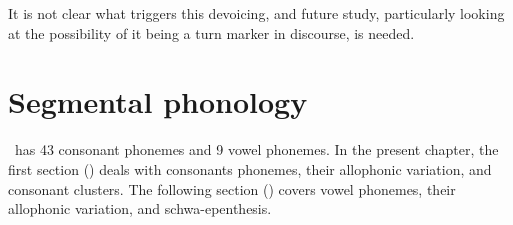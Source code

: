 It is not clear what triggers this devoicing, and future study, particularly looking at the possibility of it being a turn marker in discourse, is needed.



\chapter{Segmental phonology}\label{csANDvs}
\PS\ has 43 consonant phonemes and 9 vowel phonemes. In the present chapter, the first section () deals with consonants phonemes, their allophonic variation, and consonant clusters. 
The following section () covers vowel phonemes, their allophonic variation, and schwa-epenthesis. 



